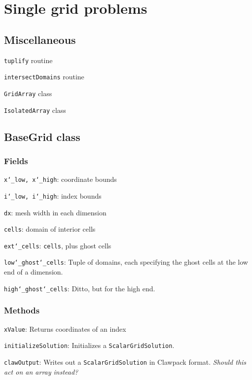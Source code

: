 \documentclass[11pt]{article}
\newcommand{\uscore}{\char`\_}
\begin{document}
\section*{Single grid problems}

\subsection*{Miscellaneous}

\texttt{tuplify} routine

\texttt{intersectDomains} routine

\texttt{GridArray} class

\texttt{IsolatedArray} class



\subsection*{BaseGrid class}

\subsubsection*{Fields}

\texttt{x\uscore{}low, x\uscore{}high}: coordinate bounds

\texttt{i\uscore{}low, i\uscore{}high}: index bounds

\texttt{dx}: mesh width in each dimension

\texttt{cells}: domain of interior cells

\texttt{ext\uscore{}cells}: \texttt{cells}, plus ghost cells

\texttt{low\uscore{}ghost\uscore{}cells}: Tuple of domains, each specifying the ghost cells at the low end of a dimension.

\texttt{high\uscore{}ghost\uscore{}cells}: Ditto, but for the high end.



\subsubsection*{Methods}

\texttt{xValue}: Returns coordinates of an index

\texttt{initializeSolution}: Initializes a \texttt{ScalarGridSolution}.

\texttt{clawOutput}: Writes out a \texttt{ScalarGridSolution} in Clawpack format.  \textit{Should this act on an array instead?}
\end{document}
